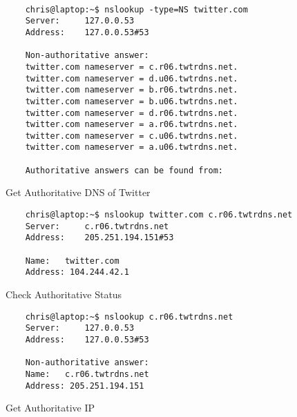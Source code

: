 \documentclass{assignment-x}
\begin{document}
\pagebreak\
\begin{figure}
  \begin{verbatim}
    chris@laptop:~$ nslookup -type=NS twitter.com
    Server:		127.0.0.53
    Address:	127.0.0.53#53
    
    Non-authoritative answer:
    twitter.com	nameserver = c.r06.twtrdns.net.
    twitter.com	nameserver = d.u06.twtrdns.net.
    twitter.com	nameserver = b.r06.twtrdns.net.
    twitter.com	nameserver = b.u06.twtrdns.net.
    twitter.com	nameserver = d.r06.twtrdns.net.
    twitter.com	nameserver = a.r06.twtrdns.net.
    twitter.com	nameserver = c.u06.twtrdns.net.
    twitter.com	nameserver = a.u06.twtrdns.net.
    
    Authoritative answers can be found from:
    \end{verbatim}
  \caption{Get Authoritative DNS of Twitter}
  \label{fig:getAuthoritative}
\end{figure}


\begin{figure}
  \begin{verbatim}
    chris@laptop:~$ nslookup twitter.com c.r06.twtrdns.net
    Server:		c.r06.twtrdns.net
    Address:	205.251.194.151#53
    
    Name:	twitter.com
    Address: 104.244.42.1
  \end{verbatim}
  \caption{Check Authoritative Status}
  \label{fig:CheckAuthoritative}
\end{figure}

\begin{figure}
  \begin{verbatim}
    chris@laptop:~$ nslookup c.r06.twtrdns.net
    Server:		127.0.0.53
    Address:	127.0.0.53#53
    
    Non-authoritative answer:
    Name:	c.r06.twtrdns.net
    Address: 205.251.194.151
  \end{verbatim}
  \caption{Get Authoritative IP}
  \label{fig:AuthoritativeIP}
\end{figure}

\pagebreak
\end{document}
